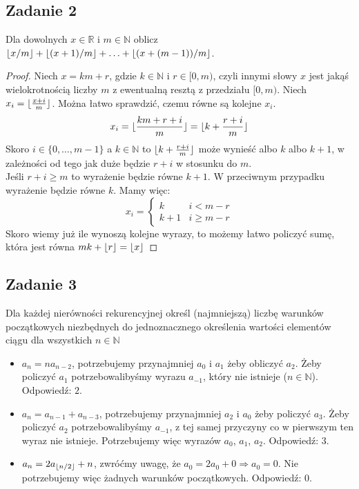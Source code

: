 \documentclass[a4paper]{article}
\DeclarePairedDelimiter\floor{\lfloor}{\rfloor}
\begin{document}
\subsection*{Zadanie 2}
Dla dowolnych $x\in \mathbb{R}$ i $m \in \mathbb{N}$ oblicz $\floor{x/m}+\floor{(x+1)/m}+\ldots+\floor{(x+(m-1))/m}$.

\begin{proof}
Niech $x=km+r$, gdzie $k\in \mathbb{N}$ i $r \in [0,m)$, czyli innymi słowy $x$ jest jakąś wielokrotnością liczby $m$ z ewentualną resztą z przedziału $[0,m)$. Niech $x_i=\floor{\frac{x+i}{m}}$. Można łatwo sprawdzić, czemu równe są kolejne $x_i$.
$$x_i=\floor{\frac{km+r+i}{m}}=\floor{k + \frac{r+i}{m}} $$
Skoro $i\in \lbrace 0,\ldots,m-1 \rbrace$ a $k \in \mathbb{N}$ to $\floor{k + \frac{r+i}{m}}$ może wynieść albo $k$ albo $k+1$, w zależności od tego jak duże będzie $r+i$ w stosunku do $m$.\\
Jeśli $r+i\geq m$ to wyrażenie będzie równe $k+1$. W przeciwnym przypadku wyrażenie będzie równe $k$. Mamy więc:
$$x_i = \left\{\begin{matrix}
k & i < m-r\\
k+1 & i \geq m-r 
\end{matrix}\right.
$$
Skoro wiemy już ile wynoszą kolejne wyrazy, to możemy łatwo policzyć sumę, która jest równa $mk+\floor{r}=\floor{x}$
\end{proof}


\subsection*{Zadanie 3}
Dla każdej nierówności rekurencyjnej określ (najmniejszą) liczbę warunków początkowych niezbędnych do jednoznacznego określenia wartości elementów ciągu dla wszystkich $n \in \mathbb{N}$
\begin{itemize}

\item $a_n=na_{n-2}$, potrzebujemy przynajmniej $a_0$ i $a_1$ żeby obliczyć $a_2$. Żeby policzyć $a_1$ potrzebowalibyśmy wyrazu $a_{-1}$, który nie istnieje ($n \in \mathbb{N}$). Odpowiedź: $2$.
\item $a_n=a_{n-1}+a_{n-3}$, potrzebujemy przynajmniej $a_2$ i $a_0$ żeby policzyć $a_3$. Żeby policzyć $a_2$ potrzebowalibyśmy $a_{-1}$, z tej samej przyczyny co w pierwszym ten wyraz nie istnieje. Potrzebujemy więc wyrazów $a_0$, $a_1$, $a_2$. Odpowiedź: $3$.
\item $a_n=2a_{\floor{n/2}}+n$, zwróćmy uwagę, że $a_0=2a_0+0 \Rightarrow a_0=0$. Nie potrzebujemy więc żadnych warunków początkowych. Odpowiedź: 0.
\end{itemize}
\end{document}

